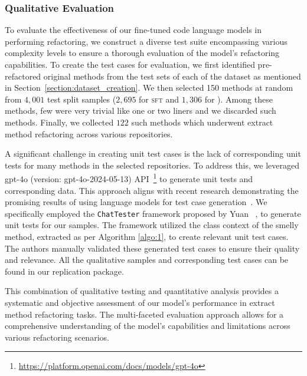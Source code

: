 \subsubsection{Qualitative Evaluation} \label{subsubsection:qualitative}


To evaluate the effectiveness of our fine-tuned code language models in performing \exm{} refactoring, we construct a diverse test suite encompassing various 
complexity levels to ensure a thorough evaluation of the model's refactoring capabilities. To create the test cases for evaluation, we first identified pre-refactored original methods from the test sets of each of the dataset as mentioned in Section~\ref{section:dataset_creation}. We then selected 150 methods at random from $4,001$ test split samples ($2,695$ for \textsc{sft} and $1,306$ for \rl{}). Among these methods, few were very trivial like one or two liners and we discarded such methods. Finally, we collected $122$ such methods which underwent extract method refactoring across various repositories. 

A significant challenge in creating unit test cases is the lack of corresponding unit tests for many methods in the selected repositories.
To address this, we leveraged gpt-$4$o (version: gpt-4o-2024-05-13) API~\footnote{\href{https://platform.openai.com/docs/models/gpt-4o}{https://platform.openai.com/docs/models/gpt-4o}}
to generate unit tests and corresponding data. This approach aligns with recent research demonstrating the promising results of using language models for test case generation~\cite{tufano2020unit, nashid2023retrieval}. We specifically employed the \texttt{ChatTester} framework proposed by Yuan \etal{}~\cite{yuan2024chatgpt}, to generate unit tests for our samples. The framework utilized the class context of the smelly method, extracted as per Algorithm \ref{algo:1}, to create relevant unit test cases. The authors manually validated these generated test cases to ensure their quality and relevance. 
All the qualitative samples and corresponding test cases can be found in our replication package.

This combination of qualitative testing and quantitative analysis provides a systematic and objective assessment of our model's performance in extract method refactoring tasks. The multi-faceted evaluation approach allows for a comprehensive understanding of the model's capabilities and limitations across various \exm{} refactoring scenarios.
